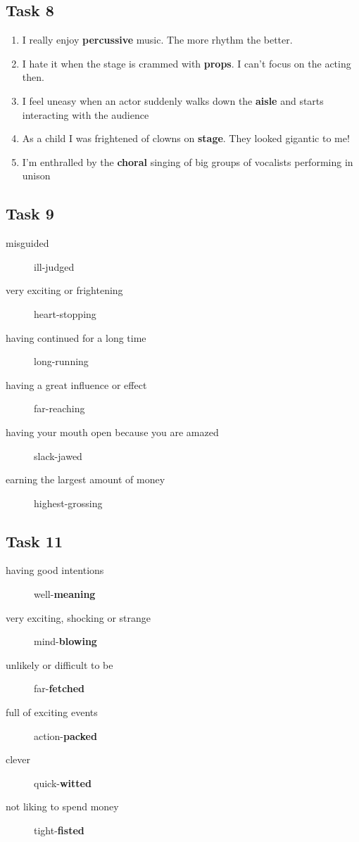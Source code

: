 \documentclass[a4paper]{article}
\begin{document}
\subsection{Task 8}
\begin{enumerate}
    \item I really enjoy {\bf percussive} music. The more rhythm the better.
    \item I hate it when the stage is crammed with {\bf props}. I can't focus on the acting then.
    \item I feel uneasy when an actor suddenly walks down the {\bf aisle} and starts interacting with the audience
    \item As a child I was frightened of clowns on {\bf stage}. They looked gigantic to me!
    \item I'm enthralled by the {\bf choral} singing of big groups of vocalists performing in unison
\end{enumerate}
\subsection{Task 9}
\begin{description}
    \item[misguided] ill-judged
    \item[very exciting or frightening] heart-stopping
    \item[having continued for a long time] long-running
    \item[having a great influence or effect] far-reaching
    \item[having your mouth open because you are amazed] slack-jawed
    \item[earning the largest amount of money] highest-grossing
\end{description}
\subsection{Task 11}
\begin{description}
    \item[having good intentions] well-{\bf meaning}
    \item[very exciting, shocking or strange] mind-{\bf blowing}
    \item[unlikely or difficult to be] far-{\bf fetched}
    \item[full of exciting events] action-{\bf packed}
    \item[clever] quick-{\bf witted}
    \item[not liking to spend money] tight-{\bf fisted}
\end{description}
\pagebreak
\end{document}
